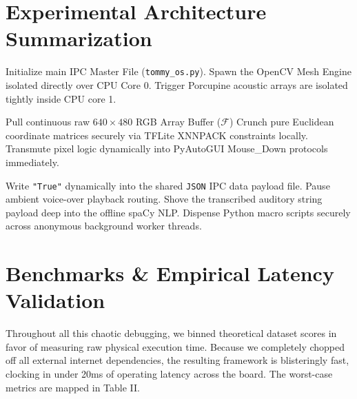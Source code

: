 \documentclass[conference]{IEEEtran}
\begin{document}

\section{Experimental Architecture Summarization}

\begingroup
\begin{algorithm*}[H]
\caption{How the IPC Cores Actually Talk to Each Other}
\label{alg_multimodal}
\begin{algorithmic}[1]

\STATE Initialize main IPC Master File (\texttt{tommy\_os.py}).
\STATE Spawn the OpenCV Mesh Engine isolated directly over CPU Core 0.
\STATE Trigger Porcupine acoustic arrays are isolated tightly inside CPU core 1.


\STATE Pull continuous raw $640\times480$ RGB Array Buffer ($\mathcal{F}$)
\STATE Crunch pure Euclidean coordinate matrices securely via TFLite XNNPACK constraints locally.
    \STATE Transmute pixel logic dynamically into PyAutoGUI Mouse\_Down protocols immediately.
\ENDIF

    \STATE Write \texttt{"True"} dynamically into the shared \texttt{JSON} IPC data payload file.
    \STATE Pause ambient voice-over playback routing.
    \STATE Shove the transcribed auditory string payload deep into the offline spaCy NLP.
    \STATE Dispense Python macro scripts securely across anonymous background worker threads.
\ENDIF

\ENDWHILE

\end{algorithmic}
\end{algorithm*}
\endgroup


\section{Benchmarks \& Empirical Latency Validation}

Throughout all this chaotic debugging, we binned theoretical dataset scores in favor of measuring raw physical execution time. Because we completely chopped off all external internet dependencies, the resulting framework is blisteringly fast, clocking in under 20ms of operating latency across the board. The worst-case metrics are mapped in Table II.
\end{document}
